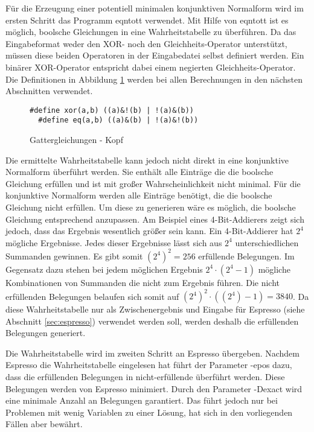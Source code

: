 Für die Erzeugung einer potentiell minimalen konjunktiven Normalform wird im ersten Schritt das Programm eqntott verwendet. Mit Hilfe von eqntott
ist es möglich, boolsche Gleichungen in eine Wahrheitstabelle zu überführen. Da das Eingabeformat weder den XOR- noch den Gleichheits-Operator unterstützt,
müssen diese beiden Operatoren in der Eingabedatei selbst definiert werden. Ein binärer XOR-Operator entspricht dabei einem negierten Gleichheits-Operator.
Die Definitionen in Abbildung \ref{fig:gatter_equations_head} werden bei allen Berechnungen in den nächsten Abschnitten verwendet.
\begin{figure}[!h]
  \centering
  \begin{minipage}[c]{14.5cm}
    \begin{lstlisting}[]
  #define xor(a,b) ((a)&!(b) | !(a)&(b))
  #define eq(a,b) ((a)&(b) | !(a)&!(b))
    \end{lstlisting}
  \end{minipage}
  \caption{Gattergleichungen - Kopf}
  \label{fig:gatter_equations_head}
\end{figure}

Die ermittelte Wahrheitstabelle kann jedoch nicht direkt in eine konjunktive Normalform überführt werden. Sie enthält alle Einträge die die boolsche Gleichung erfüllen
und ist mit großer Wahrscheinlichkeit nicht minimal. Für die konjunktive Normalform werden alle Einträge benötigt, die die boolsche Gleichung nicht erfüllen. Um diese zu
generieren wäre es möglich, die boolsche Gleichung entsprechend anzupassen. Am Beispiel eines 4-Bit-Addierers zeigt sich jedoch, dass das Ergebnis wesentlich größer sein kann.
Ein 4-Bit-Addierer hat $2^4$ mögliche Ergebnisse. Jedes dieser Ergebnisse lässt sich aus $2^4$ unterschiedlichen Summanden gewinnen. Es gibt somit $(2^4)^2 = 256$
erfüllende Belegungen. Im Gegensatz dazu stehen bei jedem möglichen Ergebnis $2^4 \cdot (2^4-1)$ mögliche Kombinationen von Summanden die nicht zum Ergebnis führen.
Die nicht erfüllenden Belegungen belaufen sich somit auf $(2^4)^2 \cdot ((2^4)-1) = 3840$. Da diese Wahrheitstabelle nur als Zwischenergebnis und Eingabe für
Espresso (siehe Abschnitt \ref{sec:espresso}) verwendet werden soll, werden deshalb die erfüllenden Belegungen generiert.

Die Wahrheitstabelle wird im zweiten Schritt an Espresso übergeben. Nachdem Espresso die Wahrheitstabelle eingelesen hat führt der Parameter -epos dazu,
dass die erfüllenden Belegungen in nicht-erfüllende überführt werden. Diese Belegungen werden von Espresso minimiert. Durch den Parameter -Dexact wird
eine minimale Anzahl an Belegungen garantiert. Das führt jedoch nur bei Problemen mit wenig Variablen zu einer Lösung, hat sich in den vorliegenden
Fällen aber bewährt.

